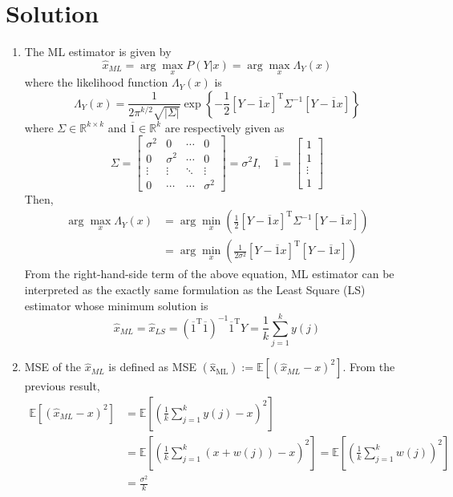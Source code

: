 \documentclass[10pt,a4paper,oneside]{article}
\begin{document}
\section*{Solution}
\begin{enumerate}
\item The ML estimator is given by
\[
\hat{x}_{M L}=\arg \max _{x} P(Y | x)=\arg \max _{x} \Lambda_{Y}(x)
\]
where the likelihood function $\Lambda_{Y}(x)$ is
\[
\Lambda_{Y}(x)=\frac{1}{2 \pi^{k / 2} \sqrt{|\Sigma|}} \exp \left\{-\frac{1}{2}[Y-\overline{1} x]^{\mathrm{T}} \Sigma^{-1}[Y-\overline{1} x]\right\}
\]
where $\Sigma \in \mathbb{R}^{k \times k}$ and $\overline{1} \in \mathbb{R}^{k}$ are respectively given as
\[
\Sigma=\left[\begin{array}{cccc}{\sigma^{2}} & {0} & {\cdots} & {0} \\ {0} & {\sigma^{2}} & {\cdots} & {0} \\ {\vdots} & {\vdots} & {\ddots} & {\vdots} \\ {0} & {\cdots} & {\cdots} & {\sigma^{2}}\end{array}\right]=\sigma^{2} I, \quad \overline{1}=\left[\begin{array}{c}{1} \\ {1} \\ {\vdots} \\ {1}\end{array}\right]
\]
Then,
\[
\begin{aligned} \arg \max _{x} \Lambda_{Y}(x) &=\arg \min _{x}\left(\frac{1}{2}[Y-\overline{1} x]^{\mathrm{T}} \Sigma^{-1}[Y-\overline{1} x]\right) \\ &=\arg \min _{x}\left(\frac{1}{2 \sigma^{2}}[Y-\overline{1} x]^{\mathrm{T}}[Y-\overline{1} x]\right) \end{aligned}
\]
From the right-hand-side term of the above equation, ML estimator can be interpreted as the
exactly same formulation as the Least Square (LS) estimator whose minimum solution is
\[
\hat{x}_{M L}=\hat{x}_{L S}=\left(\overline{1}^{\mathrm{T}} \overline{1}\right)^{-1} \overline{1}^{\mathrm{T}} Y=\frac{1}{k} \sum_{j=1}^{k} y(j)
\]
\item MSE of the $\hat{x}_{M L}$ is defined as MSE $\left(\hat{\mathrm{x}}_{\mathrm{ML}}\right) :=\mathbb{E}\left[\left(\hat{x}_{M L}-x\right)^{2}\right] .$ From the previous result,
\[\begin{aligned} \mathbb{E}\left[\left(\hat{x}_{M L}-x\right)^{2}\right] &=\mathbb{E}\left[\left(\frac{1}{k} \sum_{j=1}^{k} y(j)-x\right)^{2}\right] \\ &=\mathbb{E}\left[\left(\frac{1}{k} \sum_{j=1}^{k}(x+w(j))-x\right)^{2}\right]=\mathbb{E}\left[\left(\frac{1}{k} \sum_{j=1}^{k} w(j)\right)^{2}\right]\\&=\frac{\sigma^{2}}{k} \end{aligned}\]

\end{enumerate}
\end{document}

